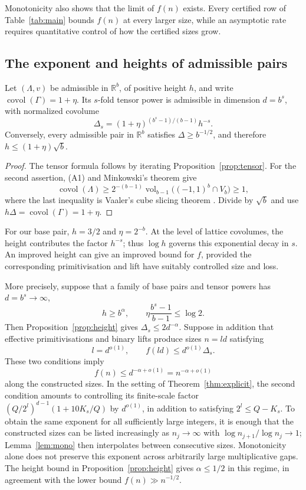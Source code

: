 \documentclass[12pt]{article}
\newcommand{\R}{\mathbb{R}}
\newcommand{\covol}{\operatorname{covol}}
\newcommand{\Lat}{\Lambda}
\begin{document}
Monotonicity also shows that the limit of $f(n)$ exists. Every
certified row of Table~\ref{tab:main} bounds $f(n)$ at every larger
size, while an asymptotic rate requires quantitative control of
how the certified sizes grow.

\subsection{The exponent and heights of admissible pairs}
\begin{proposition}\label{prop:height}
Let $(\Lat,v)$ be admissible in $\R^b$, of positive height $h$, and
write $\covol(\Gamma)=1+\eta$. Its $s$-fold tensor power is admissible
in dimension $d=b^s$, with normalized covolume
\[
 \Delta_s=(1+\eta)^{(b^s-1)/(b-1)}h^{-s}.
\]
Conversely, every admissible pair in $\R^b$ satisfies
$\Delta\ge b^{-1/2}$, and therefore
$h\le(1+\eta)\sqrt b$.
\end{proposition}
\begin{proof}
The tensor formula follows by iterating Proposition~\ref{prop:tensor}.
For the second assertion, (A1) and Minkowski's theorem give
\[
 \covol(\Lat)\ge
 2^{-(b-1)}\operatorname{vol}_{b-1}\bigl((-1,1)^b\cap V_b\bigr)
 \ge1,
\]
where the last inequality is Vaaler's cube slicing theorem
\cite{Va79}. Divide by $\sqrt b$ and use
$h\Delta=\covol(\Gamma)=1+\eta$.
\end{proof}

For our base pair, $h=3/2$ and $\eta=2^{-b}$. At the level of lattice
covolumes, the height contributes the factor $h^{-s}$; thus $\log h$
governs this exponential decay in $s$. An improved height can give
an improved bound for $f$, provided the corresponding
primitivisation and lift have suitably controlled size and loss.

More precisely, suppose that a family of base pairs and tensor
powers has $d=b^s\to\infty$,
\[
 h\ge b^\alpha,\qquad
 \eta\frac{b^s-1}{b-1}\le\log2.
\]
Then Proposition~\ref{prop:height} gives
$\Delta_s\le2d^{-\alpha}$. Suppose in addition that effective
primitivisations and binary lifts produce sizes $n=ld$ satisfying
\[
 l=d^{o(1)},\qquad
 f(ld)\le d^{o(1)}\Delta_s.
\]
These two conditions imply
\[
 f(n)\le d^{-\alpha+o(1)}=n^{-\alpha+o(1)}
\]
along the constructed sizes. In the setting of
Theorem~\ref{thm:explicit}, the second condition amounts to
controlling its finite-scale factor
$(Q/2^l)^{d-1}(1+10K_s/Q)$ by $d^{o(1)}$, in addition to satisfying
$2^l\le Q-K_s$.
To obtain the same exponent for all sufficiently large integers,
it is enough that the constructed sizes can be listed increasingly
as $n_j\to\infty$ with
$\log n_{j+1}/\log n_j\to1$; Lemma~\ref{lem:mono} then interpolates
between consecutive sizes. Monotonicity alone does not preserve
this exponent across arbitrarily large multiplicative gaps.
The height bound in Proposition~\ref{prop:height} gives
$\alpha\le1/2$ in this regime, in agreement with the lower bound
$f(n)\gg n^{-1/2}$.
\end{document}
